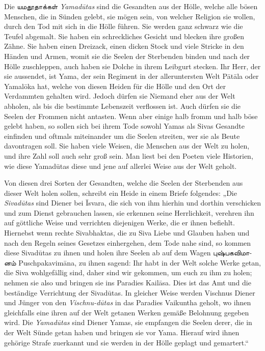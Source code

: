 \documentclass{article}
\newcommand{\TamilText}[1]{\texttamil{#1}}
\newcommand{\tam}[1]{\TamilText{#1}}
\begin{document}
Die \tam{யமதூதாக்கள்} \emph{Yamad\={u}tas} sind die Gesandten aus der Hölle, welche alle bösen Menschen, die in Sünden gelebt, sie mögen sein, von welcher Religion sie wollen, durch den Tod mit sich in die Hölle führen. Sie werden ganz schwarz wie die Teufel abgemalt. Sie haben ein schreckliches Gesicht und blecken ihre großen Zähne. Sie haben einen Dreizack, einen dicken Stock und viele Stricke in den Händen und Armen, womit sie die Seelen der Sterbenden binden und nach der Hölle zuschleppen, auch haben sie Dolche in ihrem Leibgurt stecken. Ihr Herr, der sie aussendet, ist Yama, der sein Regiment in der alleruntersten Welt P\={a}t\={a}la oder Yamal\={o}ka hat, welche von diesen Heiden für die Hölle und den Ort der Verdammten gehalten wird. Jedoch dürfen sie Niemand eher aus der Welt abholen, als bis die bestimmte Lebenszeit verflossen ist. Auch dürfen sie die Seelen der Frommen nicht antasten. Wenn aber einige halb fromm und halb böse gelebt haben, so sollen sich bei ihrem Tode sowohl Yamas als Sivas Gesandte einfinden und oftmals miteinander um die Seelen streiten, wer sie als Beute davontragen soll. Sie haben viele Weisen, die Menschen aus der Welt zu holen, und ihre Zahl soll auch sehr groß sein. Man liest bei den Poeten viele Historien, wie diese Yamad\={u}tas diese und jene auf allerlei Weise aus der Welt geholt.

Von diesen drei Sorten der Gesandten, welche die Seelen der Sterbenden aus dieser Welt holen sollen, schreibt ein Heide in einem Briefe folgendes: „Die \emph{Sivad\={u}tas} sind Diener bei \={I}svara, die sich von ihm hierhin und dorthin verschicken und zum Dienst gebrauchen lassen, sie erkennen seine Herrlichkeit, verehren ihn auf göttliche Weise und verrichten diejenigen Werke, die er ihnen befiehlt. Hiernebst wenn rechte Sivabhaktas, die zu Siva Liebe und Glauben haben und nach den Regeln seines Gesetzes einhergehen, dem Tode nahe sind, so kommen diese Sivad\={u}tas zu ihnen und holen ihre Seelen ab auf dem Wagen \tam{புஷ்பகவிமானம்} Puschpakavim\={a}na, zu ihnen sagend: Ihr habt in der Welt solche Werke getan, die Siva wohlgefällig sind, daher sind wir gekommen, um euch zu ihm zu holen; nehmen sie also und bringen sie ins Paradies Kail\={a}sa. Dies ist das Amt und die beständige Verrichtung der Sivad\={u}tas. In gleicher Weise werden Vischnus Diener und Jünger von den \emph{Vischnu-d\={u}tas} in das Paradies Vaikuntha geholt, wo ihnen gleichfalls eine ihren auf der Welt getanen Werken gemäße Belohnung gegeben wird. Die \emph{Yamad\={u}tas} sind Diener Yamas, sie empfangen die Seelen derer, die in der Welt Sünde getan haben und bringen sie vor Yama. Hierauf wird ihnen gehörige Strafe zuerkannt und sie werden in der Hölle geplagt und gemartert.“
\end{document}
